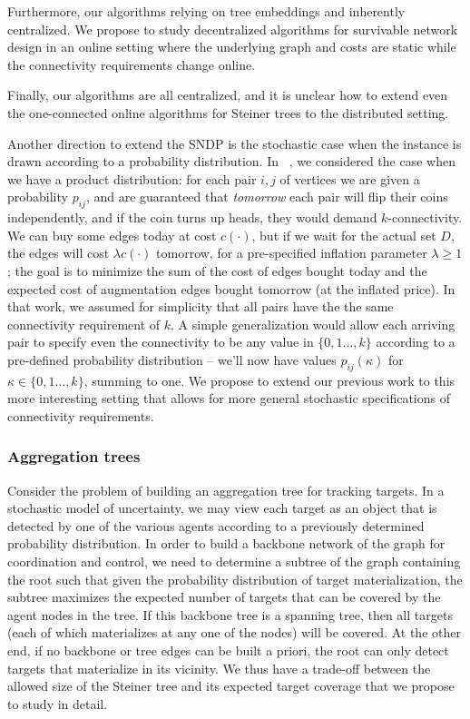 Furthermore, our algorithms relying on tree embeddings and inherently centralized.  
We propose to study decentralized algorithms for survivable network design in an online
setting where the underlying graph and costs are static while the
connectivity requirements change online. 

Finally, our algorithms are all centralized, and it is unclear how to extend even the one-connected online algorithms for Steiner trees to the distributed setting.


Another direction to extend the SNDP is the
stochastic case when the instance is drawn according to a probability
distribution. In ~\cite{gkr10}, we considered the case when we have a product
distribution: for each pair $i,j$ of vertices we are given a probability $p_{ij}$,
and are guaranteed that \emph{tomorrow} each pair will flip their coins
independently, and if the coin turns up heads, they would demand
$k$-connectivity. We can buy some edges today at cost $c(\cdot)$, but if
we wait for the actual set $D$, the edges will cost $\lambda c(\cdot)$
tomorrow, for a pre-specified inflation parameter $\lambda \geq 1$; the goal
is to minimize the sum of the cost of edges bought today and the
expected cost of augmentation edges bought tomorrow (at the inflated price).
In that work, we assumed for simplicity that all pairs have the the same
connectivity requirement of $k$. A simple generalization would allow each arriving pair to specify even the connectivity to be any value in $\{0,1\ldots,k\}$ according to a pre-defined probability distribution -- we'll now have values $p_{ij}(\kappa)$ for $\kappa \in \{0,1\ldots,k\}$, summing to one. We propose to extend our previous work to this more interesting setting that allows for more general stochastic specifications of connectivity requirements.

\subsubsection{Aggregation trees}
Consider the problem of building an aggregation tree for tracking
targets.  In a stochastic model of uncertainty, we may view each
target as an object that is detected by one of the various agents
according to a previously determined probability distribution.  In
order to build a backbone network of the graph for coordination and
control, we need to determine a subtree of the graph containing the
root such that given the probability distribution of target
materialization, the subtree maximizes the expected number of targets
that can be covered by the agent nodes in the tree. If this backbone
tree is a spanning tree, then all targets (each of which materializes
at any one of the nodes) will be covered. At the other end, if no
backbone or tree edges can be built a priori, the root can only detect
targets that materialize in its vicinity. We thus have a trade-off
between the allowed size of the Steiner tree and its expected target
coverage that we propose to study in detail.

